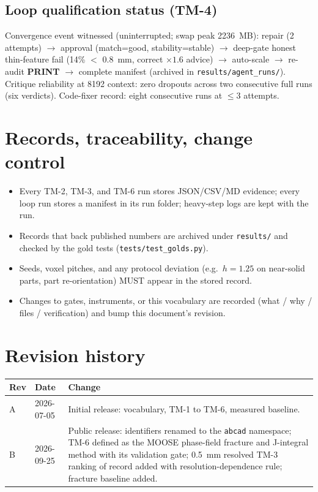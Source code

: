 \documentclass[11pt]{article}
\newcommand{\term}[1]{\textbf{#1}}
\begin{document}
\subsection{Loop qualification status (TM-4)}
Convergence event witnessed (uninterrupted; swap peak 2236~MB): repair (2 attempts) $\rightarrow$
approval (match=good, stability=stable) $\rightarrow$ deep-gate honest thin-feature fail (14\% $<$
0.8~mm, correct $\times 1.6$ advice) $\rightarrow$ auto-scale $\rightarrow$ re-audit \term{PRINT}
$\rightarrow$ complete manifest (archived in \texttt{results/agent\_runs/}). Critique reliability at
8192 context: zero dropouts across two consecutive full runs (six verdicts). Code-fixer record: eight
consecutive runs at $\le 3$ attempts.

\section{Records, traceability, change control}
\begin{itemize}[nosep]
  \item Every TM-2, TM-3, and TM-6 run stores JSON/CSV/MD evidence; every loop run stores a manifest
    in its run folder; heavy-step logs are kept with the run.
  \item Records that back published numbers are archived under \texttt{results/} and checked by the
    gold tests (\texttt{tests/test\_golds.py}).
  \item Seeds, voxel pitches, and any protocol deviation (e.g.\ $h=1.25$ on near-solid parts, part
    re-orientation) MUST appear in the stored record.
  \item Changes to gates, instruments, or this vocabulary are recorded (what / why / files /
    verification) and bump this document's revision.
\end{itemize}

\section*{Revision history}
\begin{center}
\begin{tabular}{llp{}}
\toprule
Rev & Date & Change \\
\midrule
A & 2026-07-05 & Initial release: vocabulary, TM-1 to TM-6, measured baseline. \\
B & 2026-09-25 & Public release: identifiers renamed to the \texttt{abcad} namespace; TM-6 defined as
the MOOSE phase-field fracture and J-integral method with its validation gate; 0.5~mm resolved TM-3
ranking of record added with resolution-dependence rule; fracture baseline added. \\
\bottomrule
\end{tabular}
\end{center}
\end{document}
